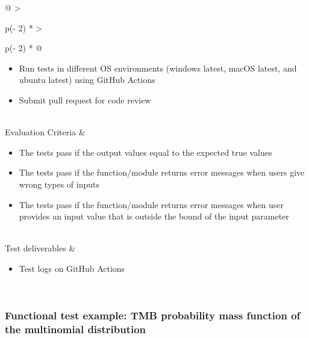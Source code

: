\documentclass[
]{book}
\providecommand{\tightlist}{%
  \setlength{\itemsep}{0pt}\setlength{\parskip}{0pt}}
\begin{document}
\begin{longtable}[]{@{}
  >{\raggedright\arraybackslash}p{(\columnwidth - 2\tabcolsep) * }
  >{\raggedright\arraybackslash}p{(\columnwidth - 2\tabcolsep) * }@{}}
\begin{minipage}[t]{\linewidth}
\begin{itemize}
\item
  Run tests in different OS environments (windows latest, macOS latest, and ubuntu latest) using GitHub Actions
\item
  Submit pull request for code review
\end{itemize}
\end{minipage} \\
Evaluation Criteria & \begin{minipage}[t]{\linewidth}\raggedright
\begin{itemize}
\item
  The tests pass if the output values equal to the expected true values
\item
  The tests pass if the function/module returns error messages when users give wrong types of inputs
\item
  The tests pass if the function/module returns error messages when user provides an input value that is outside the bound of the input parameter
\end{itemize}
\end{minipage} \\
Test deliverables & \begin{minipage}[t]{\linewidth}\raggedright
\begin{itemize}
\tightlist
\item
  Test logs on GitHub Actions
\end{itemize}
\end{minipage} \\
\bottomrule
\end{longtable}

\hypertarget{functional-test-example-tmb-probability-mass-function-of-the-multinomial-distribution}{%
\subsubsection{Functional test example: TMB probability mass function of the multinomial distribution}\label{functional-test-example-tmb-probability-mass-function-of-the-multinomial-distribution}}
\end{document}

